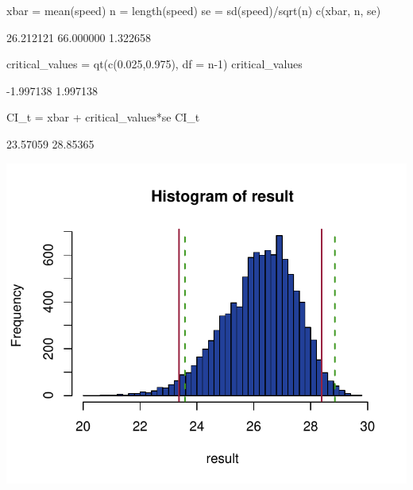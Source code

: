 \documentclass[a4paper]{article}\usepackage[]{graphicx}\usepackage[]{xcolor}
\makeatletter
\def\maxwidth{ %
  \ifdim\Gin@nat@width>\linewidth
    \linewidth
  \else
    \Gin@nat@width
  \fi
}
\makeatother
\begin{document}
\begin{Schunk}
\begin{Sinput}
xbar = mean(speed)
n = length(speed)
se = sd(speed)/sqrt(n)
c(xbar, n, se)
\end{Sinput}
\begin{Soutput}
[1] 26.212121 66.000000  1.322658
\end{Soutput}
\begin{Sinput}
critical_values = qt(c(0.025,0.975), 
                     df = n-1)
critical_values
\end{Sinput}
\begin{Soutput}
[1] -1.997138  1.997138
\end{Soutput}
\begin{Sinput}
CI_t = xbar + critical_values*se
CI_t
\end{Sinput}
\begin{Soutput}
[1] 23.57059 28.85365
\end{Soutput}


{\centering \includegraphics[width=\maxwidth]{figure/listings-unnamed-chunk-169-1} 

}

\end{Schunk}
\end{document}
